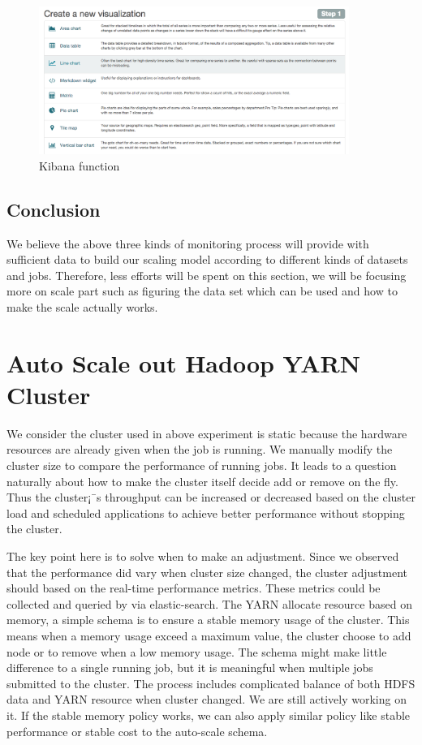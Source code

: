 \documentclass{article}
\begin{document}
\begin{figure}[ht!]
 \centering
  \includegraphics[width=0.9\textwidth,natwidth=1200,natheight=400]{fig4_5.png}
 \caption{Kibana function}
 \label{fig:kibanaFunc}
 \end{figure}
 \subsection{Conclusion}
 We believe the above three kinds of monitoring process will provide with sufficient data to build our scaling model according to different kinds of datasets and jobs. Therefore, less efforts will be spent on this section, we will be focusing more on scale part such as figuring the data set which can be used and how to make the scale actually works.
 
\section{ Auto Scale out Hadoop YARN Cluster}
We consider the cluster used in above experiment is static because the hardware resources are already given when the job is running. We manually modify the cluster size to compare the performance of running jobs. It leads to a question naturally about how to make the cluster itself decide add or remove on the fly. Thus the cluster¡¯s throughput can be increased or decreased based on the cluster load and scheduled applications to achieve better performance without stopping the cluster.	

The key point here is to solve when to make an adjustment. Since we observed that the performance did vary when cluster size changed, the cluster adjustment should based on the real-time performance metrics. These metrics could be collected and queried by via elastic-search. The YARN allocate resource based on memory, a simple schema is to ensure a stable memory usage of the cluster. This means when a memory usage exceed a maximum value, the cluster choose to add node or to remove when a low memory usage. The schema might make little difference to a single running job, but it is meaningful when multiple jobs submitted to the cluster. The process includes complicated balance of both HDFS data and YARN resource when cluster changed. We are still actively working on it. If the stable memory policy works, we can also apply similar policy like stable performance or stable cost to the auto-scale schema.
%
%
\end{document}
